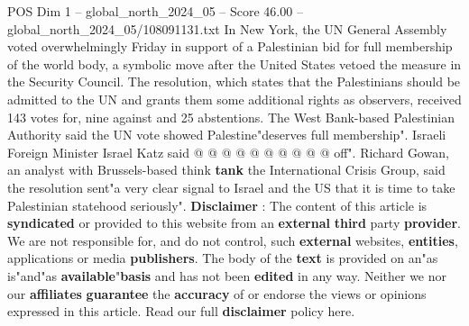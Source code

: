 \begin{textsample}{POS Dim 1 – global\_north\_2024\_05 – Score 46.00 – global\_north\_2024\_05/108091131.txt}
In New York, the UN General Assembly voted overwhelmingly Friday in support of a Palestinian bid for full membership of the world body, a symbolic move after the United States vetoed the measure in the Security Council.
The resolution, which states that the Palestinians should be admitted to the UN and grants them some additional rights as observers, received 143 votes for, nine against and 25 abstentions.
The West Bank-based Palestinian Authority said the UN vote showed Palestine"deserves full membership".
Israeli Foreign Minister Israel Katz said @ @ @ @ @ @ @ @ @ @ off".
Richard Gowan, an analyst with Brussels-based think \textbf{tank} the International Crisis Group, said the resolution sent"a very clear signal to Israel and the US that it is time to take Palestinian statehood seriously". \textbf{Disclaimer} : The content of this article is \textbf{syndicated} or provided to this website from an \textbf{external} \textbf{third} party \textbf{provider}.
We are not responsible for, and do not control, such \textbf{external} websites, \textbf{entities}, applications or media \textbf{publishers}.
The body of the \textbf{text} is provided on an"as is"and"as \textbf{available}"\textbf{basis} and has not been \textbf{edited} in any way.
Neither we nor our \textbf{affiliates} \textbf{guarantee} the \textbf{accuracy} of or endorse the views or opinions expressed in this article.
Read our full \textbf{disclaimer} policy here.

\end{textsample}
